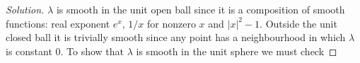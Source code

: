 \begin{proof}[Solution]\leavevmode
\(\lambda\) is smooth in the unit open ball since it is a composition of smooth functions: real exponent \(e^x\), \(1/x\) for nonzero  $x$ and \(|x|^2-1\). Outside the unit closed ball it is trivially smooth since any point has a neighbourhood in which \(\lambda\) is constant 0. To show that \(\lambda\) is smooth in the unit sphere we must check 
\end{proof}

